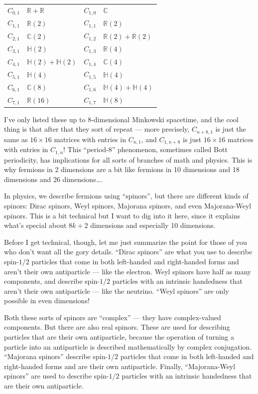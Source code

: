 \documentclass{article}
\begin{document}
\begin{longtable}[]{@{}rlrl@{}}
\toprule
\endhead
\(C_{0,1}\) & \(\mathbb{R}+\mathbb{R}\) & \(C_{1,0}\) &
\(\mathbb{C}\)\tabularnewline
\(C_{1,1}\) & \(\mathbb{R}(2)\) & \(C_{1,1}\) &
\(\mathbb{R}(2)\)\tabularnewline
\(C_{2,1}\) & \(\mathbb{C}(2)\) & \(C_{1,2}\) &
\(\mathbb{R}(2)+\mathbb{R}(2)\)\tabularnewline
\(C_{3,1}\) & \(\mathbb{H}(2)\) & \(C_{1,3}\) &
\(\mathbb{R}(4)\)\tabularnewline
\(C_{4,1}\) & \(\mathbb{H}(2)+\mathbb{H}(2)\) & \(C_{1,4}\) &
\(\mathbb{C}(4)\)\tabularnewline
\(C_{5,1}\) & \(\mathbb{H}(4)\) & \(C_{1,5}\) &
\(\mathbb{H}(4)\)\tabularnewline
\(C_{6,1}\) & \(\mathbb{C}(8)\) & \(C_{1,6}\) &
\(\mathbb{H}(4)+\mathbb{H}(4)\)\tabularnewline
\(C_{7,1}\) & \(\mathbb{R}(16)\) & \(C_{1,7}\) &
\(\mathbb{H}(8)\)\tabularnewline
\bottomrule
\end{longtable}

I've only listed these up to \(8\)-dimensional Minkowski spacetime, and
the cool thing is that after that they sort of repeat --- more
precisely, \(C_{n+8,1}\) is just the same as \(16\times16\) matrices
with entries in \(C_{n,1}\), and \(C_{1,n+8}\) is just \(16\times16\)
matrices with entries in \(C_{1,n}\)! This ``period-8'' phenomenon,
sometimes called Bott periodicity, has implications for all sorts of
branches of math and physics. This is why fermions in 2 dimensions are a
bit like fermions in 10 dimensions and 18 dimensions and 26
dimensions\ldots.

In physics, we describe fermions using ``spinors'', but there are
different kinds of spinors: Dirac spinors, Weyl spinors, Majorana
spinors, and even Majorana-Weyl spinors. This is a bit technical but I
want to dig into it here, since it explains what's special about
\(8k + 2\) dimensions and especially 10 dimensions.

Before I get technical, though, let me just summarize the point for
those of you who don't want all the gory details. ``Dirac spinors'' are
what you use to describe spin-\(1/2\) particles that come in both
left-handed and right-handed forms and aren't their own antiparticle ---
like the electron. Weyl spinors have half as many components, and
describe spin-\(1/2\) particles with an intrinsic handedness that aren't
their own antiparticle --- like the neutrino. ``Weyl spinors'' are only
possible in even dimensions!

Both these sorts of spinors are ``complex'' --- they have complex-valued
components. But there are also real spinors. These are used for
describing particles that are their own antiparticle, because the
operation of turning a particle into an antiparticle is described
mathematically by complex conjugation. ``Majorana spinors'' describe
spin-\(1/2\) particles that come in both left-handed and right-handed
forms and are their own antiparticle. Finally, ``Majorana-Weyl spinors''
are used to describe spin-\(1/2\) particles with an intrinsic handedness
that are their own antiparticle.
\end{document}
